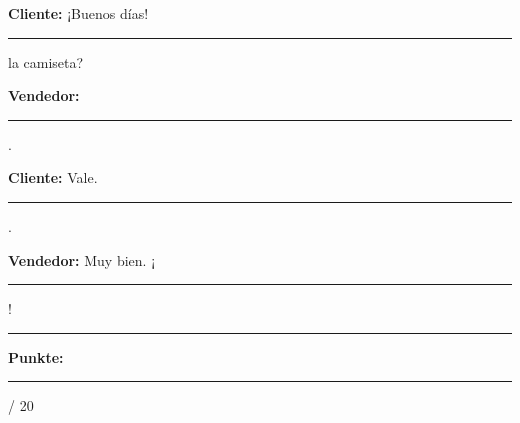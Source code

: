 \documentclass[11pt, a4paper]{article}
\newcommand{\maxpunkte}{20}
\newcommand{\luecke}[1]{\rule{#1}{0.4pt}}
\begin{document}
\vspace{0.5em}

\noindent
\textbf{Cliente:} ¡Buenos días! \luecke{5cm} la camiseta?

\textbf{Vendedor:} \luecke{8cm}.

\textbf{Cliente:} Vale. \luecke{5cm}.

\textbf{Vendedor:} Muy bien. ¡\luecke{3cm}!

\vspace{20pt}


\hrule
\vspace{10pt}

\begin{flushright}
\textbf{Punkte:} \luecke{1cm} / \maxpunkte
\end{flushright}
\end{document}
